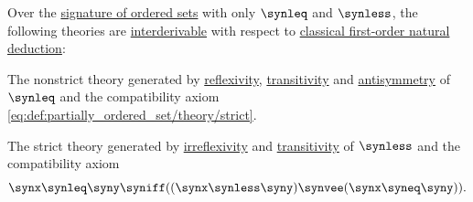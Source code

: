 \begin{proposition}\label{thm:partially_ordered_set_theories}
  Over the \hyperref[def:partially_ordered_set/theory]{signature of ordered sets} with only \( {\synleq} \) and \( {\synless} \), the following theories are \hyperref[def:interderivability]{interderivable} with respect to \hyperref[def:fol_natural_deduction]{classical first-order natural deduction}:

  \begin{thmenum}
     The nonstrict theory generated by \hyperref[def:binary_relation/reflexive]{reflexivity}, \hyperref[def:binary_relation/transitive]{transitivity} and \hyperref[def:binary_relation/antisymmetric]{antisymmetry} of \( {\synleq} \) and the compatibility axiom \eqref{eq:def:partially_ordered_set/theory/strict}.

     The strict theory generated by \hyperref[def:binary_relation/irreflexive]{irreflexivity} and \hyperref[def:binary_relation/transitive]{transitivity} of \( {\synless} \) and the compatibility axiom
    \begin{equation}\label{eq:thm:partially_ordered_set_theories/strict/compatibility}
      \synx \synleq \syny \syniff ((\synx \synless \syny) \synvee (\synx \syneq \syny)).
    \end{equation}
  \end{thmenum}
\end{proposition}
